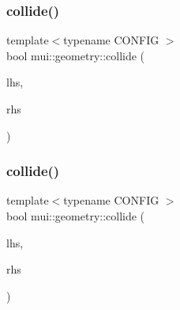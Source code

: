 \mbox{\label{namespacemui_1_1geometry_a13954d0260c8be6a2326ada37c60ac36}} 
\subsubsection{\texorpdfstring{collide()}{collide()}\hspace{0.1cm}{\footnotesize\ttfamily [4/10]}}
{\footnotesize\ttfamily template$<$typename C\+O\+N\+F\+IG $>$ \\
bool mui\+::geometry\+::collide (\begin{DoxyParamCaption}\item[{const \hyperlink{classmui_1_1geometry_1_1shape}{shape}$<$ C\+O\+N\+F\+IG $>$ \&}]{lhs,  }\item[{const \hyperlink{classmui_1_1geometry_1_1any__shape}{any\+\_\+shape}$<$ C\+O\+N\+F\+IG $>$ \&}]{rhs }\end{DoxyParamCaption})}

\mbox{\label{namespacemui_1_1geometry_ac722ff7275c45db25593fcae9b3acdb6}} 
\subsubsection{\texorpdfstring{collide()}{collide()}\hspace{0.1cm}{\footnotesize\ttfamily [5/10]}}
{\footnotesize\ttfamily template$<$typename C\+O\+N\+F\+IG $>$ \\
bool mui\+::geometry\+::collide (\begin{DoxyParamCaption}\item[{const \hyperlink{classmui_1_1geometry_1_1point}{point}$<$ C\+O\+N\+F\+IG $>$ \&}]{lhs,  }\item[{const \hyperlink{classmui_1_1geometry_1_1point}{point}$<$ C\+O\+N\+F\+IG $>$ \&}]{rhs }\end{DoxyParamCaption})}

\mbox{\label{namespacemui_1_1geometry_aa5a5160128c0f4f38e2c9f64e7367d76}} 
